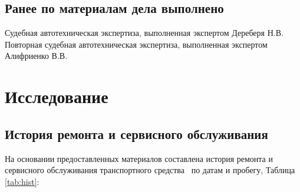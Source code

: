 \subsection{Ранее по материалам дела выполнено}
\noindent Судебная автотехническая экспертиза, выполненная  экспертом Дереберя Н.В.\\
Повторная судебная автотехническая экспертиза, выполненная экспертом Алифриенко В.В.
%
%
\section{Исследование}
%
\subsection{История ремонта и сервисного обслуживания}

На основании предоставленных материалов составлена история ремонта и сервисного обслуживания транспортного средства  \, по датам и пробегу, Таблица \ref*{tab:hist}:

